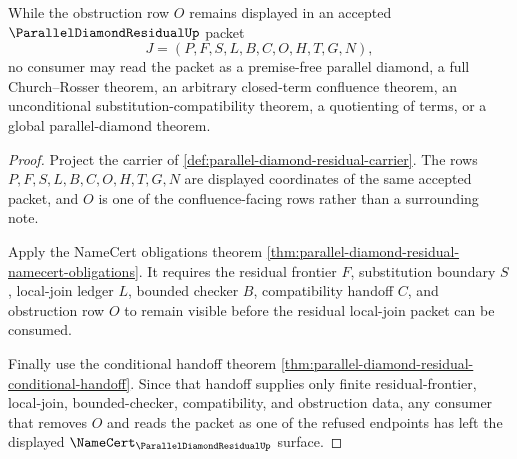 \begin{theorem}
\label{thm:parallel-diamond-residual-obstruction-retention}
While the obstruction row $O$ remains displayed in an accepted $\ParallelDiamondResidualUp$ packet
$$
J=(P,F,S,L,B,C,O,H,T,G,N),
$$
no consumer may read the packet as a premise-free parallel diamond, a full Church--Rosser theorem, an arbitrary closed-term confluence theorem, an unconditional substitution-compatibility theorem, a quotienting of terms, or a global parallel-diamond theorem.
\end{theorem}
\begin{proof}
Project the carrier of \autoref{def:parallel-diamond-residual-carrier}. The rows $P,F,S,L,B,C,O,H,T,G,N$ are displayed coordinates of the same accepted packet, and $O$ is one of the confluence-facing rows rather than a surrounding note.

Apply the NameCert obligations theorem \autoref{thm:parallel-diamond-residual-namecert-obligations}. It requires the residual frontier $F$, substitution boundary $S$, local-join ledger $L$, bounded checker $B$, compatibility handoff $C$, and obstruction row $O$ to remain visible before the residual local-join packet can be consumed.

Finally use the conditional handoff theorem \autoref{thm:parallel-diamond-residual-conditional-handoff}. Since that handoff supplies only finite residual-frontier, local-join, bounded-checker, compatibility, and obstruction data, any consumer that removes $O$ and reads the packet as one of the refused endpoints has left the displayed $\NameCert_{\ParallelDiamondResidualUp}$ surface.
\end{proof}

